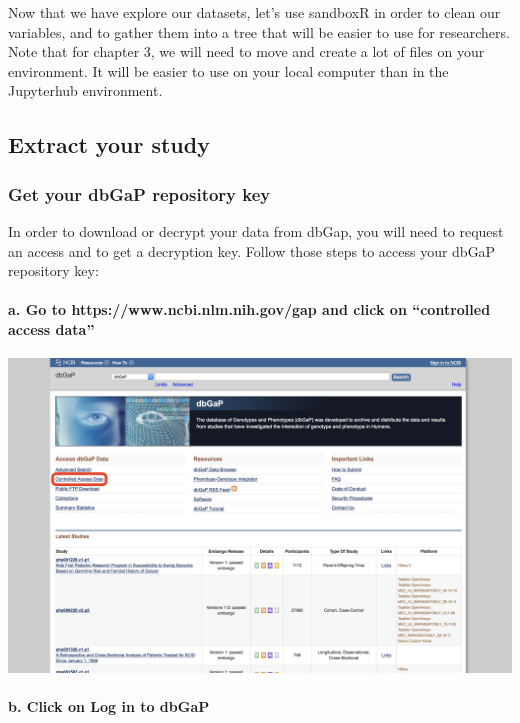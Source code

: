 \documentclass[11pt]{article}
\makeatletter
\def\maxwidth{\ifdim\Gin@nat@width>\linewidth\linewidth
    \else\Gin@nat@width\fi}
\let\Oldincludegraphics\includegraphics
\renewcommand{\includegraphics}[1]{\Oldincludegraphics[width=.8\maxwidth]{#1}}
\makeatother
\begin{document}
    
    Now that we have explore our datasets, let's use sandboxR in order to
clean our variables, and to gather them into a tree that will be easier
to use for researchers. Note that for chapter 3, we will need to move
and create a lot of files on your environment. It will be easier to use
on your local computer than in the Jupyterhub environment.

\hypertarget{extract-your-study}{%
\subsection{Extract your study}\label{extract-your-study}}

\hypertarget{get-your-dbgap-repository-key}{%
\subsubsection{Get your dbGaP repository
key}\label{get-your-dbgap-repository-key}}

In order to download or decrypt your data from dbGap, you will need to
request an access and to get a decryption key. Follow those steps to
access your dbGaP repository key:

    \hypertarget{a.-go-to-httpswww.ncbi.nlm.nih.govgap-and-click-on-controlled-access-data}{%
\paragraph{a. Go to https://www.ncbi.nlm.nih.gov/gap and click on
``controlled access data''}\label{a.-go-to-httpswww.ncbi.nlm.nih.govgap-and-click-on-controlled-access-data}}

  \includegraphics{Screenshots/Screen1.png}

    \hypertarget{b.-click-on-log-in-to-dbgap}{%
\paragraph{b. Click on Log in to dbGaP}\label{b.-click-on-log-in-to-dbgap}}
\ 
\end{document}
